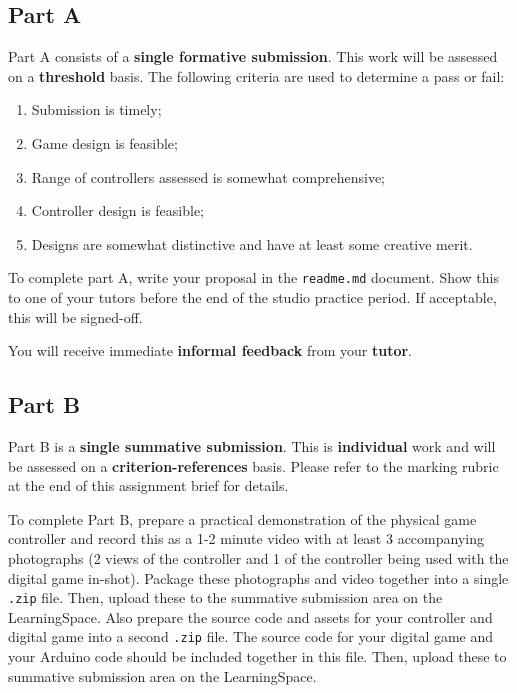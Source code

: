 \documentclass{../../fal_assignment}
\begin{document}
\subsection*{Part A}

Part A consists of a \textbf{single formative submission}. This work will be assessed on a \textbf{threshold} basis. The following criteria are used to determine a pass or fail:

\begin{enumerate}[label=(\alph*)]
	\item Submission is timely;
	\item Game design is feasible;
	\item Range of controllers assessed is somewhat comprehensive;
	\item Controller design is feasible;
	\item Designs are somewhat distinctive and have at least some creative merit.
\end{enumerate}

To complete part A, write your proposal in the \texttt{readme.md} document. Show this to one of your tutors before the end of the studio practice period. If acceptable, this will be signed-off.

You will receive immediate \textbf{informal feedback} from your \textbf{tutor}.

\subsection*{Part B}

Part B is a \textbf{single summative submission}. This is \textbf{individual} work and will be assessed on a \textbf{criterion-references} basis. Please refer to the marking rubric at the end of this assignment brief for details.

To complete Part B, prepare a practical demonstration of the physical game controller and record this as a 1-2 minute video with at least 3 accompanying photographs (2 views of the controller and 1 of the controller being used with the digital game in-shot). Package these photographs and video together into a single \texttt{.zip} file. Then, upload these to the summative submission area on the LearningSpace. Also prepare the source code and assets for your controller and digital game into a second \texttt{.zip} file. The source code for your digital game and your Arduino code should be included together in this file. Then, upload these to summative submission area on the LearningSpace. 
\end{document}
